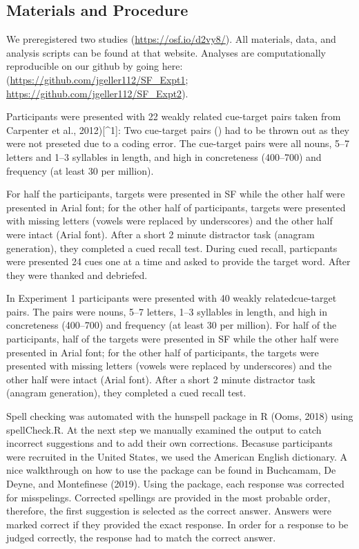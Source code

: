 \documentclass[doc]{apa6}
\begin{document}
\hypertarget{materials-and-procedure}{%
\subsection{Materials and Procedure}\label{materials-and-procedure}}

We preregistered two studies (\url{https://osf.io/d2vy8/}). All materials, data, and analysis scripts can be found at that website. Analyses are computationally reproducible on our github by going here:(\url{https://github.com/jgeller112/SF_Expt1}; \url{https://github.com/jgeller112/SF_Expt2}).

Participants were presented with 22 weakly related cue-target pairs taken from Carpenter et al., 2012){[}\^{}1{]}: Two cue-target pairs () had to be thrown out as they were not preseted due to a coding error. The cue-target pairs were all nouns, 5--7 letters and 1--3 syllables in length, and high in concreteness (400--700) and frequency (at least 30 per million).

For half the participants, targets were presented in SF while the other half were presented in Arial font; for the other half of participants, targets were presented with missing letters (vowels were replaced by underscores) and the other half were intact (Arial font). After a short 2 minute distractor task (anagram generation), they completed a cued recall test. During cued recall, particpants were presented 24 cues one at a time and asked to provide the target word. After they were thanked and debriefed.

In Experiment 1 participants were presented with 40 weakly relatedcue-target pairs. The pairs were nouns, 5--7 letters, 1--3 syllables in length, and high in concreteness (400--700) and frequency (at least 30 per million). For half of the participants, half of the targets were presented in SF while the other half were presented in Arial font; for the other half of participants, the targets were presented with missing letters (vowels were replaced by underscores) and the other half were intact (Arial font). After a short 2 minute distractor task (anagram generation), they completed a cued recall test.

Spell checking was automated with the hunspell package in R (Ooms, 2018) using spellCheck.R. At the next step we manually examined the output to catch incorrect suggestions and to add their own corrections. Becasuse participants were recruited in the United States, we used the American English dictionary. A nice walkthrough on how to use the package can be found in Buchcamam, De Deyne, and Montefinese (2019). Using the package, each response was corrected for misspelings. Corrected spellings are provided in the most probable order, therefore, the first suggestion is selected as the correct answer. Answers were marked correct if they provided the exact response. In order for a response to be judged correctly, the response had to match the correct answer.
\end{document}
